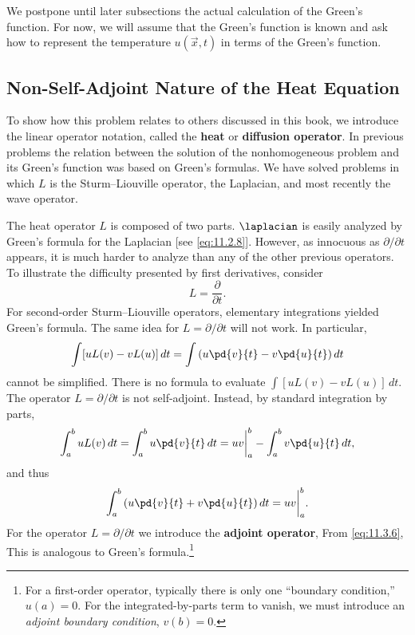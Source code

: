 We postpone until later subsections the actual calculation of the Green's function.  For now, we will assume that the Green's function is known and ask how to represent the temperature $u(\vec{x},t)$ in terms of the Green's function.

\subsection{Non-Self-Adjoint Nature of the Heat Equation}
\label{subsec:heat-non-self-adjoint}

To show how this problem relates to others discussed in this book, we introduce the linear operator notation,
called the \textbf{heat} or \textbf{diffusion operator}.  In previous problems the relation between the solution of the nonhomogeneous problem and its Green's function was based on Green's formulas.  We have solved problems in which $L$ is the Sturm--Liouville operator, the Laplacian, and most recently the wave operator.

The heat operator $L$ is composed of two parts.  $\laplacian$ is easily analyzed by Green's formula for the Laplacian [see \eqref{eq:11.2.8}].  However, as innocuous as $\partial/\partial t$ appears, it is much harder to analyze than any of the other previous operators.  To illustrate the difficulty presented by first derivatives, consider
\[
L = \frac{\partial}{\partial t}.
\]
For second-order Sturm--Liouville operators, elementary integrations yielded Green's formula.  The same idea for $L = \partial/\partial t$ will not work.  In particular,
\[
\int [uL(v) - vL(u)]\,dt = \int \left(u\pd{v}{t} - v\pd{u}{t}\right) dt
\]
cannot be simplified.  There is no formula to evaluate $\int [uL(v) - vL(u)]\,dt$.  The operator $L = \partial/\partial t$ is not self-adjoint.  Instead, by standard integration by parts,
\[
\int_a^b uL(v)\,dt = \int_a^b u\pd{v}{t}\,dt = uv\bigg|_a^b - \int_a^b v\pd{u}{t}\,dt,
\]
and thus
\begin{equation}
\label{eq:11.3.6}
\int_a^b \left(u\pd{v}{t} + v\pd{u}{t}\right) dt = uv\bigg|_a^b.
\end{equation}
For the operator $L = \partial/\partial t$ we introduce the \textbf{adjoint operator},
From \eqref{eq:11.3.6},
This is analogous to Green's formula.\footnote{For a first-order operator, typically there is only one ``boundary condition,'' $u(a) = 0$.  For the integrated-by-parts term to vanish, we must introduce an \emph{adjoint boundary condition}, $v(b) = 0$.}

